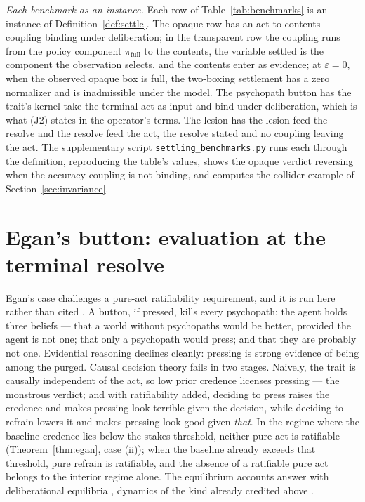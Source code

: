 \noindent\textit{Each benchmark as an instance.} Each row of Table~\ref{tab:benchmarks} is an instance of Definition~\ref{def:settle}. The opaque row has an act-to-contents coupling binding under deliberation; in the transparent row the coupling runs from the policy component $\pi_{\mathrm{full}}$ to the contents, the variable settled is the component the observation selects, and the contents enter as evidence; at $\varepsilon = 0$, when the observed opaque box is full, the two-boxing settlement has a zero normalizer and is inadmissible under the model. The psychopath button has the trait's kernel take the terminal act as input and bind under deliberation, which is what (J2) states in the operator's terms. The lesion has the lesion feed the resolve and the resolve feed the act, the resolve stated and no coupling leaving the act. The supplementary script \texttt{settling\_benchmarks.py} runs each through the definition, reproducing the table's values, shows the opaque verdict reversing when the accuracy coupling is not binding, and computes the collider example of Section~\ref{sec:invariance}.

\section{Egan's button: evaluation at the terminal resolve}
\label{sec:egan}

\noindent Egan's case challenges a pure-act ratifiability requirement, and it is run here rather than cited \cite{egan2007some}. A button, if pressed, kills every psychopath; the agent holds three beliefs --- that a world without psychopaths would be better, provided the agent is not one; that only a psychopath would press; and that they are probably not one. Evidential reasoning declines cleanly: pressing is strong evidence of being among the purged. Causal decision theory fails in two stages. Naively, the trait is causally independent of the act, so low prior credence licenses pressing --- the monstrous verdict; and with ratifiability added, deciding to press raises the credence and makes pressing look terrible given the decision, while deciding to refrain lowers it and makes pressing look good given \emph{that}. In the regime where the baseline credence lies below the stakes threshold, neither pure act is ratifiable (Theorem~\ref{thm:egan}, case (ii)); when the baseline already exceeds that threshold, pure refrain is ratifiable, and the absence of a ratifiable pure act belongs to the interior regime alone. The equilibrium accounts answer with deliberational equilibria \cite{arntzenius2008no, joyce2012regret}, dynamics of the kind already credited above \cite{skyrms1990dynamics}.

